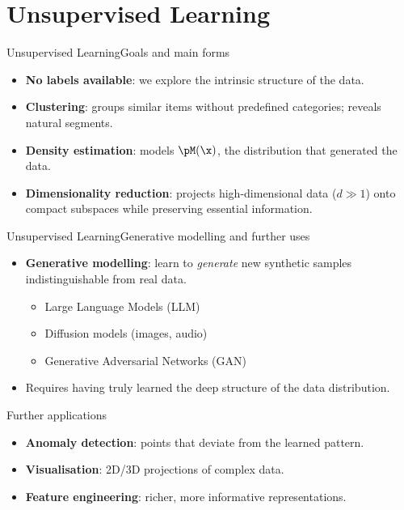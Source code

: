 \section{Unsupervised Learning}

\begin{frame}{Unsupervised Learning}{Goals and main forms}
  \begin{itemize}
    \item \textbf{No labels available}: we explore the intrinsic structure of the data.
    \item \textbf{Clustering}: groups similar items without predefined categories; reveals
          natural segments.
    \item \textbf{Density estimation}: models $\pM(\x)$, the distribution that generated
          the data.
    \item \textbf{Dimensionality reduction}: projects high-dimensional data ($d \gg 1$) onto
          compact subspaces while preserving essential information.
  \end{itemize}
\end{frame}

\begin{frame}{Unsupervised Learning}{Generative modelling and further uses}
  \begin{itemize}
    \item \textcolor{AccentBlue}{\textbf{Generative modelling}}: learn to \emph{generate}
          new synthetic samples indistinguishable from real data.
      \begin{itemize}
        \item Large Language Models (LLM)
        \item Diffusion models (images, audio)
        \item Generative Adversarial Networks (GAN)
      \end{itemize}
    \item Requires having truly learned the deep structure of the data distribution.
  \end{itemize}
  \bigskip
  \begin{block}{Further applications}
    \begin{itemize}
      \item \textbf{Anomaly detection}: points that deviate from the learned pattern.
      \item \textbf{Visualisation}: 2D/3D projections of complex data.
      \item \textbf{Feature engineering}: richer, more informative representations.
    \end{itemize}
  \end{block}
\end{frame}

